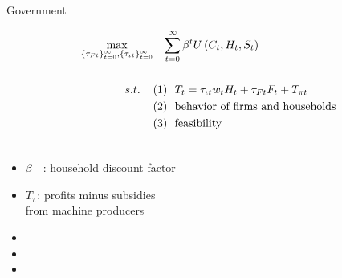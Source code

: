 \documentclass[11pt,aspectratio=169]{beamer}
\begin{document}
\begin{frame}{ Government}
	\hypertarget{gov}{}
	\vspace{-4mm}
	\centering
	\begin{minipage}[t!]{1\textwidth}
		\begin{align*}
	\max_{\{\tau_{Ft}\}_{t=0}^{\infty}, \{\tau_{\iota t}\}_{t=0}^{\infty}}&\hspace{3mm} \sum_{t=0}^{\infty}\beta^t U\left(C_t,H_t, S_t\right)\\ \ \\
{s.t.} \hspace{4mm}
		&{ (1)\ \ T_t=\tau_{\iota t}w_{t}H_{t}+{{\tau_{Ft}}}F_{t}}+T_{\pi t}\\
		& {(2)\ \  \text{behavior of firms and households}}\\
		& {(3)\ \ \text{feasibility} }\\
		& \ %
		\end{align*}
	\end{minipage}
	
	\small
	\vspace{0mm}
	\hspace{-10mm}
	\begin{minipage}[t!]{0.5\textwidth}
		\vspace{7mm}
		\begin{itemize}
						\item[] $\beta$\ \ : household discount factor\vspace{-2mm}
			\item[] $T_\pi$: profits minus subsidies \\ \hspace{5.5mm} from machine producers \vspace{0mm}
		\end{itemize}
	\end{minipage}
\begin{minipage}[t!]{0.4\textwidth}
\vspace{8mm}
\begin{itemize}
	\item[] %
	\vspace{-2mm}	
	\item[] %
	\item[] %
\end{itemize}
\end{minipage}
\end{frame}
\end{document}
